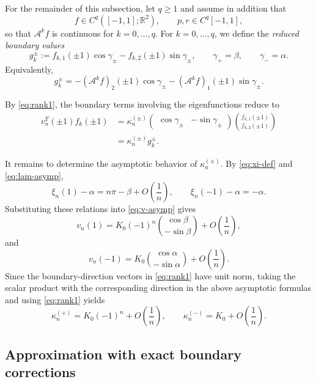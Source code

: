 \documentclass[11pt,a4paper]{article}
\theoremstyle{definition}
\begin{document}
For the remainder of this subsection, let $q\geq1$ and assume in
addition that
\[
f\in C^q([-1,1];\mathbb R^2),
\qquad
p,r\in C^q[-1,1],
\]
so that $\mathcal A^k f$ is continuous for $k=0,\dots,q$. For
$k=0,\dots,q$, we define the \emph{reduced boundary values}
\begin{equation}\label{eq:gk}
g_k^\pm
:=
f_{k,1}(\pm1)\cos\gamma_\pm
-
f_{k,2}(\pm1)\sin\gamma_\pm,
\qquad
\gamma_+=\beta,
\qquad
\gamma_-=\alpha.
\end{equation}
Equivalently,
\begin{equation}\label{eq:gk-components}
g_k^\pm
=
-(\mathcal A^k f)_2(\pm1)\cos\gamma_\pm
-
(\mathcal A^k f)_1(\pm1)\sin\gamma_\pm.
\end{equation}

By \eqref{eq:rank1}, the boundary terms involving the eigenfunctions
reduce to
\[
\begin{aligned}
v_n^T(\pm1)f_k(\pm1)
&=
\kappa_n^{(\pm)}
\begin{pmatrix}
\cos\gamma_\pm & -\sin\gamma_\pm
\end{pmatrix}
\binom{f_{k,1}(\pm1)}{f_{k,2}(\pm1)}
\\
&=
\kappa_n^{(\pm)}g_k^\pm.
\end{aligned}
\]

It remains to determine the asymptotic behavior of
$\kappa_n^{(\pm)}$. By \eqref{eq:xi-def} and \eqref{eq:lam-asymp},
\[
\xi_n(1)-\alpha
=
n\pi-\beta
+
O\!\left(\frac{1}{n}\right),
\qquad
\xi_n(-1)-\alpha
=
-\alpha.
\]
Substituting these relations into \eqref{eq:v-asymp} gives
\[
v_n(1)
=
K_0(-1)^n
\binom{\cos\beta}{-\sin\beta}
+
O\!\left(\frac{1}{n}\right),
\]
and
\[
v_n(-1)
=
K_0
\binom{\cos\alpha}{-\sin\alpha}
+
O\!\left(\frac{1}{n}\right).
\]
Since the boundary-direction vectors in \eqref{eq:rank1} have unit
norm, taking the scalar product with the corresponding direction in
the above asymptotic formulas and using \eqref{eq:rank1} yields
\begin{equation}\label{eq:kappapm-asymp}
\kappa_n^{(+)}
=
K_0(-1)^n
+
O\!\left(\frac{1}{n}\right),
\qquad
\kappa_n^{(-)}
=
K_0
+
O\!\left(\frac{1}{n}\right).
\end{equation}

\subsection{Approximation with exact boundary corrections}
\label{ssec:exact-boundary-corrections}
\end{document}
